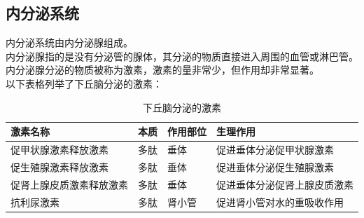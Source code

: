 \documentclass[UTF8]{ctexart}
\begin{document}
\subsection{内分泌系统}
    内分泌系统由内分泌腺组成。\\[3mm]
    内分泌腺指的是没有分泌管的腺体，其分泌的物质直接进入周围的血管或淋巴管。\\[3mm]
    内分泌腺分泌的物质被称为激素，激素的量非常少，但作用却非常显著。\\[6mm]
    以下表格列举了下丘脑分泌的激素：\vspace{5pt}
    \begin{table}[h]
        \begin{center}
            \begin{tabular}{l|l|l|l}
                \hline
                激素名称\qquad\qquad&本质\qquad\qquad&作用部位\qquad\qquad&生理作用\qquad\qquad\\ \hline
                促甲状腺激素释放激素&多肽&垂体&促进垂体分泌促甲状腺激素\\ \hline
                促生殖腺激素释放激素&多肽&垂体&促进垂体分泌促生殖腺激素\\ \hline
                促肾上腺皮质激素释放激素\qquad\qquad&多肽&垂体&促进垂体分泌促肾上腺皮质激素\\ \hline
                抗利尿激素&多肽&肾小管&促进肾小管对水的重吸收作用\\ \hline
            \end{tabular}
            \caption{下丘脑分泌的激素}
        \end{center}
    \end{table}

\newpage
\end{document}
